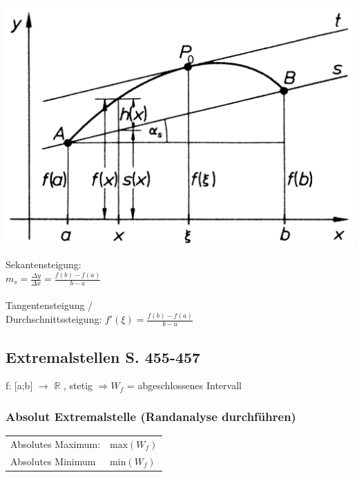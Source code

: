 			\begin{minipage}[b]{.5\linewidth} 
  			\includegraphics[width=\linewidth]{Bilder/mittelwertsatz}
			\end{minipage}
			\hfill
			\begin{minipage}[b]{.45\linewidth} 
  			
  			Sekantensteigung: \\
  			$m_s = \frac{\Delta y}{\Delta x} = \frac{f(b) - f(a)}{b - a}$ \\
  			\\
  			
  			Tangentensteigung / \\
  			Durchschnittssteigung:
  			$f'(\xi) = \frac{f(b) - f(a)}{b - a}$ \\		
				
			\end{minipage}			
		
			
			\subsection{Extremalstellen S. 455-457}
			f: [a;b] $\rightarrow$ $\mathbb{R}$ , stetig $\Rightarrow W_f$ = abgeschlossenes Intervall 
			
			\subsubsection{Absolut Extremalstelle (Randanalyse durchführen)}
			\begin{tabular}{ll}
			Absolutes Maximum: &  $\mathrm{max}(W_f)$\\
		  	Absolutes Minimum & $\mathrm{min}(W_f)$ \\
			\end{tabular}
			
